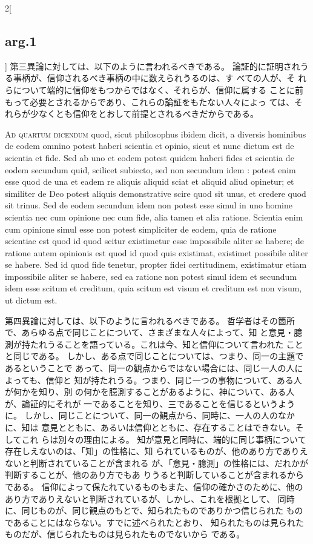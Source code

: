 \documentclass[paper=a4paper,fontsize=10pt,jafontsize=9pt,titlepage]{jlreq}
\begin{document}
\begin{paracol}{2}[\subsection{arg.1}]
第三異論に対しては、以下のように言われるべきである。
論証的に証明されうる事柄が、信仰されるべき事柄の中に数えられうるのは、す
 べての人が、そ れらについて端的に信仰をもつからではなく、それらが、信仰に属する
 ことに前もって必要とされるからであり、これらの論証をもたない人々によっ
 ては、それらが少なくとも信仰をとおして前提とされるべきだからである。

\switchcolumn*[\subsection{ad.4}]

{\scshape Ad quartum dicendum} quod, sicut
philosophus ibidem dicit, a diversis hominibus de eodem omnino potest
haberi scientia et opinio, sicut et nunc dictum est de scientia et
fide. Sed ab uno et eodem potest quidem haberi fides et scientia de
eodem secundum quid, scilicet subiecto, sed non secundum idem : potest
enim esse quod de una et eadem re aliquis aliquid sciat et aliquid aliud
opinetur; et similiter de Deo potest aliquis demonstrative scire quod
sit unus, et credere quod sit trinus. Sed de eodem secundum idem non
potest esse simul in uno homine scientia nec cum opinione nec cum fide,
alia tamen et alia ratione. Scientia enim cum opinione simul esse non
potest simpliciter de eodem, quia de ratione scientiae est quod id quod
scitur existimetur esse impossibile aliter se habere; de ratione autem
opinionis est quod id quod quis existimat, existimet possibile aliter se
habere. Sed id quod fide tenetur, propter fidei certitudinem,
existimatur etiam impossibile aliter se habere, sed ea ratione non
potest simul idem et secundum idem esse scitum et creditum, quia scitum
est visum et creditum est non visum, ut dictum est.

\switchcolumn

第四異論に対しては、以下のように言われるべきである。
哲学者はその箇所で、あらゆる点で同じことについて、さまざまな人々によって、知
 と意見・臆測が持たれうることを語っている。これは今、知と信仰について言われた
 ことと同じである。
しかし、ある点で同じことについては、つまり、同一の主題であるということで
 あって、同一の観点からではない場合には、同じ一人の人によっても、信仰と
 知が持たれうる。つまり、同じ一つの事物について、ある人が何かを知り、別
 の何かを臆測することがあるように、神について、ある人が、論証的にそれが
 一であることを知り、三であることを信じるというように。
しかし、同じことについて、同一の観点から、同時に、一人の人のなかに、知は
 意見とともに、あるいは信仰とともに、存在することはできない。そしてこれ
 らは別々の理由による。
知が意見と同時に、端的に同じ事柄について存在しえないのは、「知」の性格に、知
 られているものが、他のあり方でありえないと判断されていることが含まれる
 が、「意見・臆測」の性格には、だれかが判断することが、他のあり方でもあ
 りうると判断していることが含まれるからである。
信仰によって保たれているものもまた、信仰の確かさのために、他の
 あり方でありえないと判断されているが、しかし、これを根拠として、
 同時に、同じものが、同じ観点のもとで、知られたものでありかつ信じられた
 ものであることにはならない。すでに述べられたとおり、
 知られたものは見られたものだが、信じられたものは見られたものでないから
 である。

\end{paracol}
\end{document}
